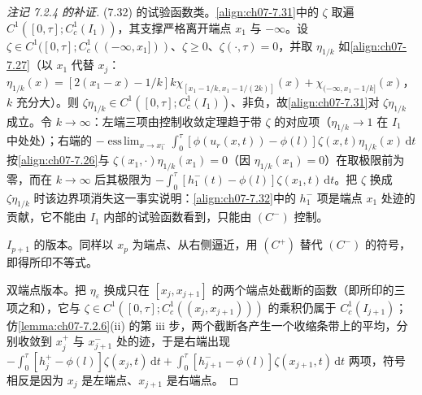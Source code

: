 \documentclass[../../main.tex]{subfiles}%
\begin{document}
\begin{proof}[注记 7.2.4 的补证]
(7.32) 的试验函数类。\eqref{align:ch07-7.31}中的 $\zeta$ 取遍 $C^1([0,\tau];C^1_c(I_1))$，其支撑严格离开端点 $x_1$ 与 $-\infty$。设 $\zeta\in C^1([0,\tau];C^1_c((-\infty,x_1]))$、$\zeta\geqslant0$、$\zeta(\cdot,\tau)=0$，并取 $\eta_{1/k}$ 如\eqref{align:ch07-7.27}（以 $x_1$ 代替 $x_j$：$\eta_{1/k}(x)=[2(x_1-x)-1/k]k\chi_{[x_1-1/k,x_1-1/(2k)]}(x)+\chi_{(-\infty,x_1-1/k]}(x)$，$k$ 充分大）。则 $\zeta\eta_{1/k}\in C^1([0,\tau];C^1_c(I_1))$、非负，故\eqref{align:ch07-7.31}对 $\zeta\eta_{1/k}$ 成立。令 $k\to\infty$：左端三项由控制收敛定理趋于带 $\zeta$ 的对应项（$\eta_{1/k}\to1$ 在 $I_1$ 中处处）；右端的 $-\operatorname*{ess\,lim}_{x\to x_1^-}\int_0^\tau[\phi(u_r(x,t))-\phi(l)]\zeta(x,t)\eta_{1/k}(x)\,\mathrm{d}t$ 按\eqref{align:ch07-7.26}与 $\zeta(x_1,\cdot)\eta_{1/k}(x_1)=0$（因 $\eta_{1/k}(x_1)=0$）在取极限前为零，而在 $k\to\infty$ 后其极限为 $-\int_0^\tau[h_1^-(t)-\phi(l)]\zeta(x_1,t)\,\mathrm{d}t$。把 $\zeta$ 换成 $\zeta\eta_{1/k}$ 时该边界项消失这一事实说明：\eqref{align:ch07-7.32}中的 $h_1^-$ 项是端点 $x_1$ 处迹的贡献，它不能由 $I_1$ 内部的试验函数看到，只能由 $(C^-)$ 控制。

$I_{p+1}$ 的版本。同样以 $x_p$ 为端点、从右侧逼近，用 $(C^+)$ 替代 $(C^-)$ 的符号，即得所印不等式。

双端点版本。把 $\eta_\varepsilon$ 换成只在 $[x_j,x_{j+1}]$ 的两个端点处截断的函数（即所印的三项之和），它与 $\zeta\in C^1([0,\tau];C^1_c((x_j,x_{j+1})))$ 的乘积仍属于 $C^1_c(I_{j+1})$；仿\cref{lemma:ch07-7.2.6}(ii) 的第 iii 步，两个截断各产生一个收缩条带上的平均，分别收敛到 $x_j^+$ 与 $x_{j+1}^-$ 处的迹，于是右端出现 $-\int_0^\tau[h_j^+-\phi(l)]\zeta(x_j,t)\,\mathrm{d}t+\int_0^\tau[h_{j+1}^--\phi(l)]\zeta(x_{j+1},t)\,\mathrm{d}t$ 两项，符号相反是因为 $x_j$ 是左端点、$x_{j+1}$ 是右端点。
\end{proof}
\end{document}

